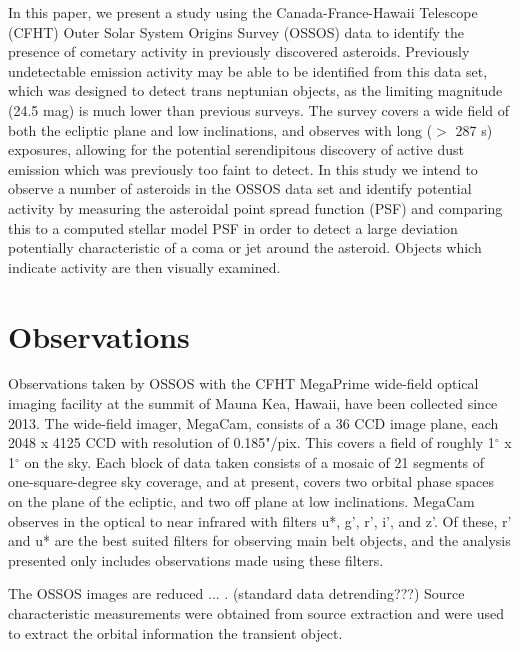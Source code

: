 \documentclass[iop,apj]{emulateapj}
\begin{document}
In this paper, we present a study using the Canada-France-Hawaii Telescope (CFHT) Outer Solar System Origins Survey (OSSOS) data to identify the presence of cometary activity in previously discovered asteroids. Previously undetectable emission activity may be able to be identified from this data set, which was designed to detect trans neptunian objects, as the limiting magnitude (24.5 mag) is much lower than previous surveys. The survey covers a wide field of both the ecliptic plane and low inclinations, and observes with long ($>$ 287 s) exposures, allowing for the potential serendipitous discovery of active dust emission which was previously too faint to detect. In this study we intend to observe a number of asteroids in the OSSOS data set and identify potential activity by measuring the asteroidal point spread function (PSF) and comparing this to a computed stellar model PSF in order to detect a large deviation potentially characteristic of a coma or jet around the asteroid. Objects which indicate activity are then visually examined. 



\section{Observations}

Observations taken by OSSOS with the CFHT MegaPrime wide-field optical imaging facility  at the summit of Mauna Kea, Hawaii, have been collected since 2013. The wide-field imager, MegaCam, consists of a 36 CCD image plane, each 2048 x 4125 CCD with resolution of 0.185"/pix. This covers a field of  roughly 1$^{\circ}$ x 1$^{\circ}$ on the sky. Each block of data taken consists of a mosaic of 21 segments of one-square-degree sky coverage, and at present, covers two orbital phase spaces on the plane of the ecliptic, and two off plane at low inclinations. MegaCam observes in the optical to near infrared with filters u*, g', r', i', and z'. Of these, r' and u* are the best suited filters for observing main belt objects, and the analysis presented only includes observations made using these filters. 

The OSSOS images are reduced ... . (standard data detrending???) Source characteristic measurements were obtained from source extraction \citep{sep} and were used to extract the orbital information the transient object. 
\end{document}
